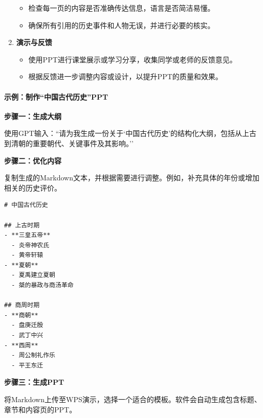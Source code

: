 \begin{enumerate}
  \begin{itemize}
  
  \item
    检查每一页的内容是否准确传达信息，语言是否简洁易懂。
  \item
    确保所有引用的历史事件和人物无误，并进行必要的核实。
  \end{itemize}
\item
  \textbf{演示与反馈}

  \begin{itemize}
  
  \item
    使用PPT进行课堂展示或学习分享，收集同学或老师的反馈意见。
  \item
    根据反馈进一步调整内容或设计，以提升PPT的质量和效果。
  \end{itemize}
\end{enumerate}

\hypertarget{ux793aux4f8bux5236ux4f5cux4e2dux56fdux53e4ux4ee3ux5386ux53f2ppt}{%
\paragraph{示例：制作``中国古代历史''PPT}\label{ux793aux4f8bux5236ux4f5cux4e2dux56fdux53e4ux4ee3ux5386ux53f2ppt}}

\textbf{步骤一：生成大纲}

使用GPT输入：``请为我生成一份关于`中国古代历史'的结构化大纲，包括从上古到清朝的重要朝代、关键事件及其影响。''

\textbf{步骤二：优化内容}

复制生成的Markdown文本，并根据需要进行调整。例如，补充具体的年份或增加相关的历史评价。

\begin{lstlisting}
# 中国古代历史

## 上古时期
- **三皇五帝**
  - 炎帝神农氏
  - 黄帝轩辕
- **夏朝**
  - 夏禹建立夏朝
  - 桀的暴政与商汤革命

## 商周时期
- **商朝**
  - 盘庚迁殷
  - 武丁中兴
- **西周**
  - 周公制礼作乐
  - 平王东迁
\end{lstlisting}

\textbf{步骤三：生成PPT}

将Markdown上传至WPS演示，选择一个适合的模板。软件会自动生成包含标题、章节和内容页的PPT。

